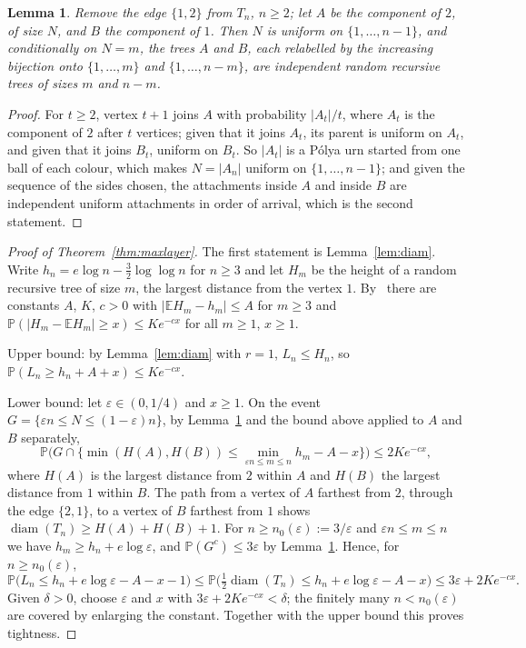 \documentclass[11pt]{amsart}
\newtheorem{lemma}[theorem]{Lemma}
\theoremstyle{definition}
\theoremstyle{remark}
\numberwithin{equation}{section}
\newcommand{\PP}{\mathbb P}
\newcommand{\E}{\mathbb E}
\newcommand{\eps}{\varepsilon}
\newcommand{\diam}{\operatorname{diam}}
\begin{document}
\begin{lemma}\label{lem:split}
Remove the edge $\{1,2\}$ from $T_n$, $n\ge2$; let $A$ be the component of $2$, of size $N$, and $B$ the component of $1$. Then $N$ is uniform on $\{1,\dots,n-1\}$, and conditionally on $N=m$, the trees $A$ and $B$, each relabelled by the increasing bijection onto $\{1,\dots,m\}$ and $\{1,\dots,n-m\}$, are independent random recursive trees of sizes $m$ and $n-m$.
\end{lemma}

\begin{proof}
For $t\ge2$, vertex $t+1$ joins $A$ with probability $|A_t|/t$, where $A_t$ is the component of $2$ after $t$ vertices; given that it joins $A_t$, its parent is uniform on $A_t$, and given that it joins $B_t$, uniform on $B_t$. So $|A_t|$ is a P\'olya urn started from one ball of each colour, which makes $N=|A_n|$ uniform on $\{1,\dots,n-1\}$; and given the sequence of the sides chosen, the attachments inside $A$ and inside $B$ are independent uniform attachments in order of arrival, which is the second statement.
\end{proof}

\begin{proof}[Proof of Theorem~\ref{thm:maxlayer}]
The first statement is Lemma~\ref{lem:diam}. Write $h_n=e\log n-\tfrac32\log\log n$ for $n\ge3$ and let $H_m$ be the height of a random recursive tree of size $m$, the largest distance from the vertex $1$. By~\cite[Corollary~1.3]{ABF} there are constants $A$, $K$, $c>0$ with $|\E H_m-h_m|\le A$ for $m\ge3$ and $\PP(|H_m-\E H_m|\ge x)\le Ke^{-cx}$ for all $m\ge1$, $x\ge1$.

Upper bound: by Lemma~\ref{lem:diam} with $r=1$, $L_n\le H_n$, so $\PP(L_n\ge h_n+A+x)\le Ke^{-cx}$.

Lower bound: let $\eps\in(0,1/4)$ and $x\ge1$. On the event $G=\{\eps n\le N\le(1-\eps)n\}$, by Lemma~\ref{lem:split} and the bound above applied to $A$ and $B$ separately,
\[
\PP\big(G\cap\{\min(H(A),H(B))\le\min_{\eps n\le m\le n}h_m-A-x\}\big)\le2Ke^{-cx},
\]
where $H(A)$ is the largest distance from $2$ within $A$ and $H(B)$ the largest distance from $1$ within $B$. The path from a vertex of $A$ farthest from $2$, through the edge $\{2,1\}$, to a vertex of $B$ farthest from $1$ shows $\diam(T_n)\ge H(A)+H(B)+1$. For $n\ge n_0(\eps):=3/\eps$ and $\eps n\le m\le n$ we have $h_m\ge h_n+e\log\eps$, and $\PP(G^c)\le3\eps$ by Lemma~\ref{lem:split}. Hence, for $n\ge n_0(\eps)$,
\[
\PP\Big(L_n\le h_n+e\log\eps-A-x-1\Big)\le\PP\Big(\tfrac12\diam(T_n)\le h_n+e\log\eps-A-x\Big)\le3\eps+2Ke^{-cx}.
\]
Given $\delta>0$, choose $\eps$ and $x$ with $3\eps+2Ke^{-cx}<\delta$; the finitely many $n<n_0(\eps)$ are covered by enlarging the constant. Together with the upper bound this proves tightness.
\end{proof}
\end{document}
